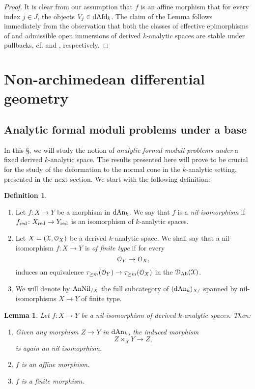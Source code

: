 \documentclass[10pt,a4paper,reqno]{amsart} %
\theoremstyle{plain}
\newtheorem{lem}[thm]{Lemma}
\theoremstyle{definition}
\newtheorem{defin}[thm]{Definition}
\theoremstyle{remark}
\numberwithin{equation}{section}
\begin{document}
\begin{proof} It is clear from our assumption that $f$ is an affine morphism that for every index $j \in J$, the objects $V_j \in \mathrm{dAfd}_k$. The claim of the Lemma
    follows immediately from the observation that
    both the classes of effective epimorphisms of \inftopoi and admissible open immersions of derived $k$-analytic spaces are stable under pullbacks,
    cf. \cite[Proposition 6.2.3.15]{HTT} and \cite[Corollary 5.11, Proposition 5.12]{Porta_Yu_Representability}, respectively.
\end{proof}


\section{Non-archimedean differential geometry}

\subsection{Analytic formal moduli problems under a base}
In this \S, we will study the notion of \emph{analytic formal moduli problems under} a fixed derived $k$-analytic space. The
results presented here will prove to be crucial for the study of the deformation to the normal cone in the $k$-analytic
setting, presented in the next section.
We start with the following definition:

\begin{defin}
    \begin{enumerate}
        \item Let $f \colon X \to Y$ be a morphism in $\mathrm{dAn}_k$. We say that $f$ is a \emph{nil-isomorphism} if $f_{\mathrm{red}} \colon X_{\mathrm{red}} \to
        Y_{\mathrm{red}}$ is an isomorphism of $k$-analytic spaces. 
        \item Let $X = (\mathcal X, \mathcal O_X)$ be a derived $k$-analytic space. We shall say that a nil-isomorphism $f \colon X \to Y$ is \emph{of finite type} if for every
            \[
                \mathcal O_Y \to \mathcal O_X,   
            \]
        induces an equivalence $\tau_{\ge m }(\mathcal O_Y) \to \tau_{\ge m}(\mathcal O_X)$ in the \infcat $\mathcal D_\mathrm{Ab}(\mathcal X)$.
        \item We will denote by $\mathrm{AnNil}_{/ X}$ the full subcategory of $(\mathrm{dAn}_k)_{X/}$
        spanned by nil-isomorphisms $X \to Y$ of finite type.
    \end{enumerate}
\end{defin}

\begin{lem} \label{lem:nil-isos_are_affine_morphisms}
    Let $f \colon X \to Y$ be a nil-isomorphism of derived $k$-analytic spaces. Then:
    \begin{enumerate}
        \item Given any morphism $Z \to Y$ in $\mathrm{dAn}_k$, the induced morphism
            \[
                Z \times_X Y \to Z,  
            \]
        is again an nil-isomoprhism.
        \item $f$ is an affine morphism.
        \item $f$ is a finite morphism.
    \end{enumerate}
\end{lem}
\end{document}
